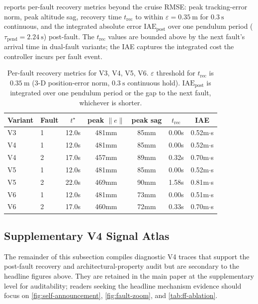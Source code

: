  reports per-fault recovery metrics beyond the cruise RMSE: peak tracking-error norm, peak altitude sag, recovery time $t_{\mathrm{rec}}$ to within $\varepsilon = \SI{0.35}{\metre}$ for $\SI{0.3}{\second}$ continuous, and the integrated absolute error $\mathrm{IAE}_{\mathrm{post}}$ over one pendulum period ($\tau_{\mathrm{pend}} = \SI{2.24}{\second}$) post-fault. The $t_{\mathrm{rec}}$ values are bounded above by the next fault's arrival time in dual-fault variants; the IAE captures the integrated cost the controller incurs per fault event.

\begin{table}[htbp]
  \caption{%
    Per-fault recovery metrics for V3, V4, V5, V6. $\varepsilon$ threshold for $t_{\mathrm{rec}}$ is $\SI{0.35}{\metre}$ (3-D position-error norm, $\SI{0.3}{\second}$ continuous hold). $\mathrm{IAE}_{\mathrm{post}}$ is integrated over one pendulum period or the gap to the next fault, whichever is shorter.%
  }
  \label{tab:recovery-iae}
  \centering
  \small
  \begin{tabular}{llccccc}
    \toprule
    Variant & Fault & $t^\star$ & peak $\|e\|$ &
      peak sag & $t_{\mathrm{rec}}$ & IAE \\
    \midrule
    V3 & 1 & 12.0s & 481mm & 85mm & 0.00s & 0.52m$\cdot$s \\
    V4 & 1 & 12.0s & 481mm & 85mm & 0.00s & 0.52m$\cdot$s \\
    V4 & 2 & 17.0s & 457mm & 89mm & 0.32s & 0.70m$\cdot$s \\
    V5 & 1 & 12.0s & 481mm & 85mm & 0.00s & 0.52m$\cdot$s \\
    V5 & 2 & 22.0s & 469mm & 90mm & 1.58s & 0.81m$\cdot$s \\
    V6 & 1 & 12.0s & 481mm & 73mm & 0.00s & 0.51m$\cdot$s \\
    V6 & 2 & 17.0s & 460mm & 72mm & 0.33s & 0.70m$\cdot$s \\
    \bottomrule
  \end{tabular}
\end{table}

\subsection{Supplementary V4 Signal Atlas}
\label{sec:VI-signal-atlas}

The remainder of this subsection compiles diagnostic V4 traces that support the post-fault recovery and architectural-property audit but are secondary to the headline figures above. They are retained in the main paper at the supplementary level for auditability; readers seeking the headline mechanism evidence should focus on \cref{fig:self-announcement}, \cref{fig:fault-zoom}, and \cref{tab:ff-ablation}.

